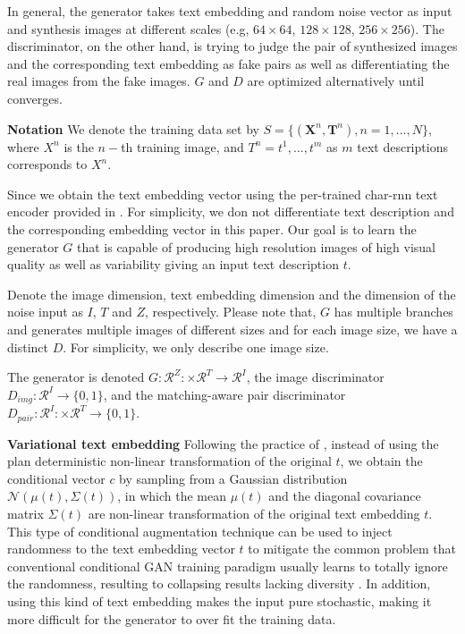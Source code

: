 \documentclass[10pt,twocolumn,letterpaper]{article}
\begin{document}
In general, the generator takes text embedding and random noise vector as input and synthesis images at different scales (e.g, $64\times64$, $128\times128$, $256\times256$). The discriminator, on the other hand, is trying to judge the pair of synthesized images and the corresponding text embedding as fake pairs as well as differentiating the real images from the fake images. $G$ and $D$ are optimized alternatively until converges.


\textbf{Notation } 
We denote the training data set by $S=\{(\bm{X}^n, \bm{T}^n),n=1,...,N\}$, where $X^n$ is the $n-$th training image, and $T^n={t^1,...,t^m}$ as $m$ text descriptions corresponds to $X^n$. 

Since we obtain the text embedding vector  using the per-trained char-rnn text encoder provided in \cite{reed2016generative}. For simplicity, we don not differentiate text description and the corresponding embedding vector in this paper.  Our goal is to learn the generator $G$ that is capable of producing high resolution images of high visual quality as well as variability giving an input text description $t$.  

Denote the image dimension, text embedding dimension and the dimension of the noise input as $I$, $T$ and $Z$, respectively. Please note that, $G$ has multiple branches and generates multiple images of different sizes and for each image size, we have a distinct $D$. For simplicity, we only describe one image size.  

The generator is denoted $G: \mathcal{R}^{Z}: \times \mathcal{R}^{T}\rightarrow\mathcal{R}^{I}$, the image discriminator $D_{img}: \mathcal{R}^{I}\rightarrow\{0, 1\}$, and the matching-aware pair discriminator $D_{pair}: \mathcal{R}^{I}: \times \mathcal{R}^{T}\rightarrow\{0, 1\}$. 

\textbf{Variational text embedding } Following the practice of \cite{han2017stackgan}, instead of using the plan deterministic non-linear transformation of the original $t$, we obtain the conditional vector $c$ by sampling from a Gaussian distribution $\mathcal{N}(\mu(t), \Sigma(t) )$, in which the mean $\mu(t)$ and the diagonal covariance matrix $\Sigma(t)$ are non-linear transformation of the original text embedding $t$. This type of conditional augmentation technique can be used to inject randomness to the text embedding vector $t$ to mitigate the common problem that conventional conditional GAN training paradigm usually learns to totally ignore the randomness, resulting to collapsing results lacking diversity \cite{reed2016generative}. In addition, using this kind of text embedding makes the input pure stochastic, making it more difficult for the generator to over fit the training data.
\end{document}

